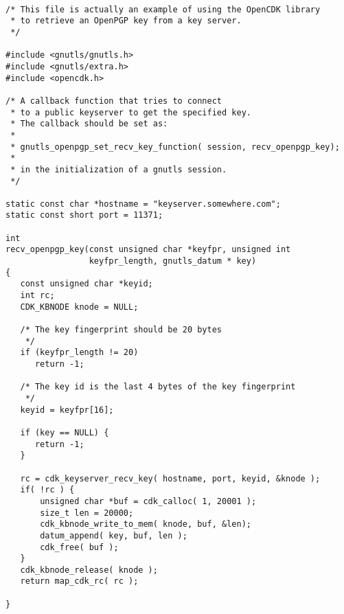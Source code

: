 \begin {verbatim}

/* This file is actually an example of using the OpenCDK library
 * to retrieve an OpenPGP key from a key server.
 */

#include <gnutls/gnutls.h>
#include <gnutls/extra.h>
#include <opencdk.h>

/* A callback function that tries to connect
 * to a public keyserver to get the specified key.
 * The callback should be set as:
 *
 * gnutls_openpgp_set_recv_key_function( session, recv_openpgp_key);
 *
 * in the initialization of a gnutls session.
 */

static const char *hostname = "keyserver.somewhere.com";
static const short port = 11371;

int
recv_openpgp_key(const unsigned char *keyfpr, unsigned int
                 keyfpr_length, gnutls_datum * key)
{
   const unsigned char *keyid;
   int rc;
   CDK_KBNODE knode = NULL;

   /* The key fingerprint should be 20 bytes
    */
   if (keyfpr_length != 20)
      return -1;

   /* The key id is the last 4 bytes of the key fingerprint
    */
   keyid = keyfpr[16];

   if (key == NULL) {
      return -1;
   }

   rc = cdk_keyserver_recv_key( hostname, port, keyid, &knode );
   if( !rc ) {
       unsigned char *buf = cdk_calloc( 1, 20001 );
       size_t len = 20000;
       cdk_kbnode_write_to_mem( knode, buf, &len);
       datum_append( key, buf, len );
       cdk_free( buf );
   }
   cdk_kbnode_release( knode );
   return map_cdk_rc( rc );

}


\end{verbatim}
